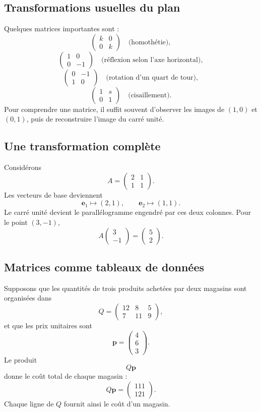 \subsection{Transformations usuelles du plan}

Quelques matrices importantes sont :
\[
\begin{pmatrix}k&0\\0&k\end{pmatrix}
\quad\text{(homothétie)},
\]
\[
\begin{pmatrix}1&0\\0&-1\end{pmatrix}
\quad\text{(réflexion selon l'axe horizontal)},
\]
\[
\begin{pmatrix}0&-1\\1&0\end{pmatrix}
\quad\text{(rotation d'un quart de tour)},
\]
\[
\begin{pmatrix}1&s\\0&1\end{pmatrix}
\quad\text{(cisaillement)}.
\]
Pour comprendre une matrice, il suffit souvent d'observer les images de $(1,0)$ et $(0,1)$, puis de reconstruire l'image du carré unité.

\subsection{Une transformation complète}

Considérons
\[
A=\begin{pmatrix}2&1\\1&1\end{pmatrix}.
\]
Les vecteurs de base deviennent
\[
\mathbf e_1\mapsto(2,1),
\qquad
\mathbf e_2\mapsto(1,1).
\]
Le carré unité devient le parallélogramme engendré par ces deux colonnes. Pour le point $(3,-1)$,
\[
A\begin{pmatrix}3\\-1\end{pmatrix}
=
\begin{pmatrix}5\\2\end{pmatrix}.
\]

\subsection{Matrices comme tableaux de données}

Supposons que les quantités de trois produits achetées par deux magasins sont organisées dans
\[
Q=\begin{pmatrix}12&8&5\\7&11&9\end{pmatrix},
\]
et que les prix unitaires sont
\[
\mathbf p=\begin{pmatrix}4\\6\\3\end{pmatrix}.
\]
Le produit
\[
Q\mathbf p
\]
donne le coût total de chaque magasin :
\[
Q\mathbf p=\begin{pmatrix}111\\121\end{pmatrix}.
\]
Chaque ligne de $Q$ fournit ainsi le coût d'un magasin.

